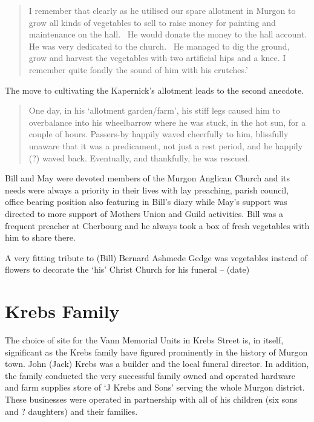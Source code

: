 \begin{quote}
I remember that clearly as he utilised our spare allotment in Murgon to
grow all kinds of vegetables to sell to raise money for painting and
maintenance on the hall.~ He would donate the money to the hall account.
He was very dedicated to the church.~ He managed to dig the ground, grow
and harvest the vegetables with two artificial hips and a knee. I
remember quite fondly the sound of him with his crutches.'
\end{quote}

The move to cultivating the Kapernick's allotment leads to the second
anecdote.

\begin{quote}
One day, in his `allotment garden/farm', his stiff legs caused him to
overbalance into his wheelbarrow where he was stuck, in the hot sun, for
a couple of hours. Passers-by happily waved cheerfully to him,
blissfully unaware that it was a predicament, not just a rest period,
and he happily (?) waved back. Eventually, and thankfully, he was
rescued.
\end{quote}

Bill and May were devoted members of the Murgon Anglican Church and its
needs were always a priority in their lives with lay preaching, parish
council, office bearing position also featuring in Bill's diary while
May's support was directed to more support of Mothers Union and Guild
activities. Bill was a frequent preacher at Cherbourg and he always took
a box of fresh vegetables with him to share there.

A very fitting tribute to (Bill) Bernard Ashmede Gedge was vegetables
instead of flowers to decorate the `his' Christ Church for his funeral
-- (date)

\hypertarget{krebs-family}{%
\section{Krebs Family}\label{krebs-family}}

The choice of site for the Vann Memorial Units in Krebs Street is, in
itself, significant as the Krebs family have figured prominently in the
history of Murgon town. John (Jack) Krebs was a builder and the local
funeral director. In addition, the family conducted the very successful
family owned and operated hardware and farm supplies store of `J Krebs
and Sons' serving the whole Murgon district. These businesses were
operated in partnership with all of his children (six sons and ?
daughters) and their families.

